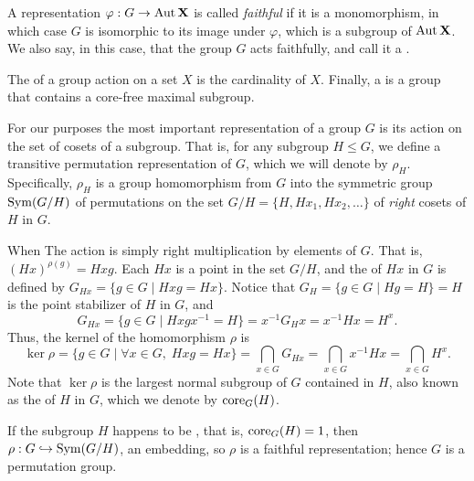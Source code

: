 A representation  $\varphi : G \rightarrow \operatorname{Aut}\mathbf{X}$ is called 
\emph{faithful}
%
if it is a monomorphism, in which case $G$ is isomorphic to its image under
$\varphi$, which is a subgroup of $\operatorname{Aut}\mathbf{X}$.  We also say, in this case, that
the group $G$ acts faithfully, and call it a .


The  of a group action on a set $X$ is the
cardinality of $X$.
Finally, a  is a group that
contains a core-free maximal subgroup.

For our purposes the most important representation of a group $G$ is its action 
on the set of cosets of a subgroup.  That is, for any subgroup $H\leq G$,
we define a transitive permutation representation of $G$, which we
will denote by $\rho_H$.  Specifically, $\rho_H$ is a group homomorphism
from $G$ into the symmetric group $\operatorname{Sym}(G/H)$ of permutations on the set $G/H =
\{H, Hx_1, Hx_2, \dots \}$ of \emph{right} cosets of $H$ in $G$.  

When 
The action is simply right multiplication by elements of $G$. That is,
$(Hx)^{\rho(g)}= Hxg$.
Each $Hx$ is a point in the set $G/H$, and the
 of $Hx$ in $G$ is defined by
$G_{Hx} = \{g\in G \mid Hxg = Hx \}$.  Notice that 
$G_H = \{g\in G \mid Hg = H \} = H$ is the point stabilizer of $H$ in $G$, and 
\[
G_{Hx} =\{g\in G \mid Hxgx^{-1}  = H \} = 
x^{-1} G_H x  = x^{-1} H x = H^x.
\]
Thus, the kernel of the homomorphism $\rho$ is 
\[
\ker \rho = \{g\in G \mid \forall x \in G,\; Hxg = Hx \} = 
\bigcap_{x\in G}G_{Hx} = \bigcap_{x\in G} x^{-1} H x  = \bigcap_{x\in G} H^x.
\]
Note that $\ker \rho$ is the largest normal subgroup of $G$ 
contained in $H$, also known as the  of $H$ in $G$, which we denote
by $\operatorname{core}_G(H)$.

If the subgroup $H$ happens to be , that is,
$\operatorname{core}_G(H)=1$, 
then $\rho : G \hookrightarrow \operatorname{Sym}(G/H)$, an embedding, so 
$\rho$ is a faithful representation; hence $G$ is a permutation group.




